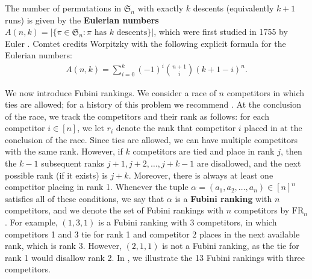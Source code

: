 \documentclass{amsart}
\newcommand{\defterm}{\textbf}
\theoremstyle{definition}
\theoremstyle{definition}
\theoremstyle{remark}
\newcommand{\FR}[1]{\mathrm{FR}_{#1}}
\begin{document}
The number of permutations in $\mathfrak{S}_n$ with exactly $k$  descents (equivalently $k+1$ runs) is given by the \defterm{Eulerian numbers} $A(n,k)=|\{\pi\in\mathfrak{S}_n : \pi \text{ has } k \text{ descents}\}|$, which were first studied in 1755 by Euler \cite{Euler}.
Comtet \cite[p.\ 243]{Comtet} credits Worpitzky \cite{Worpitzky} with the following explicit formula for the Eulerian numbers: 
\begin{align}
A(n,k)=\sum _{i=0}^{k}(-1)^{i}{\binom {n+1}{i}}(k+1-i)^{n}.
\end{align}


We now introduce Fubini rankings.
We consider a race of $n$ competitors in which ties are allowed; for a history of this problem we recommend \cite{Races_with_ties}. 
At the conclusion of the race,  we track the competitors and their rank as follows: for each competitor $i\in[n]$, we let $r_i$ denote the rank that competitor $i$ placed in at the conclusion of the race. 
Since ties are allowed, we can have 
multiple competitors with the same rank. 
However, if $k$ competitors are tied and place in rank $j$, then the $k-1$ subsequent ranks $j + 1, j + 2, \ldots, j + k - 1$ are disallowed, and the next possible rank (if it exists) is $j+k$.
Moreover, there is always at least one competitor placing in rank 1.
Whenever the tuple $\alpha=(a_1,a_2,\ldots,a_n)\in[n]^n$ satisfies all of these conditions, we say that $\alpha$
is a \defterm{Fubini ranking} with $n$ competitors, and we denote the set of Fubini rankings with $n$ competitors by $\FR{n}$.
For example, $(1,3,1)$ is a Fubini ranking with 3 competitors, in which competitors 1 and 3 tie for rank 1 and competitor 2 places in the next available rank, which is rank 3. 
However, $(2,1,1)$ is not a Fubini ranking, as the tie for rank 1 would disallow rank 2. 
In , we illustrate the 13 Fubini rankings with three competitors.
\end{document}
